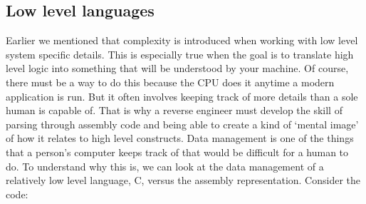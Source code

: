 \subsection{Low level languages}
Earlier we mentioned that complexity is introduced when working with low level system specific details. 
This is especially true when the goal is to translate high level logic into something that will be understood by your machine. 
Of course, there must be a way to do this because the CPU does it anytime a modern application is run. 
But it often involves keeping track of more details than a sole human is capable of. 
That is why a reverse engineer must develop the skill of parsing through assembly code and being able to create a kind of ‘mental image’ of how it relates to high level constructs.
Data management is one of the things that a person’s computer keeps track of that would be difficult for a human to do.
To understand why this is, we can look at the data management of a relatively low level language, C, versus the assembly representation. 
Consider the code: 
